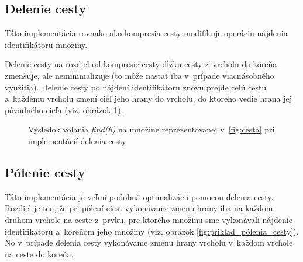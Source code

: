 \subsection{Delenie cesty}

Táto implementácia rovnako ako kompresia cesty modifikuje operáciu nájdenia identifikátoru množiny.

Delenie cesty na rozdieľ od kompresie cesty dĺžku cesty z~vrcholu do koreňa zmenšuje, ale neminimalizuje (to môže nastať iba v~prípade viacnásobného využitia). Delenie cesty po nájdení identifikátoru znovu prejde celú cestu a~každému vrcholu zmení cieľ jeho hrany do vrcholu, do ktorého vedie hrana jej pôvodného cieľa (viz. obrázok \ref{fig:priklad_delenie_cesty}).

\begin{figure}[H]
    \centering
    \captionsetup{justification=centering}
         
    \caption{Výsledok volania \emph{find(6)} na množine reprezentovanej v~\ref{fig:cesta} pri implementácií delenia cesty}
    \label{fig:priklad_delenie_cesty}
\end{figure}

\subsection{Pólenie cesty}

Táto implementácia je veľmi podobná optimalizácií pomocou delenia cesty. Rozdiel je ten, že pri pólení ciest vykonávame zmenu hrany iba na každom druhom vrchole na ceste z~prvku, pre ktorého množinu sme vykonávali nájdenie identifikátoru a~koreňom jeho množiny (viz. obrázok \ref{fig:priklad_pólenia_cesty}). No v~prípade delenia cesty vykonávame zmenu hrany vrcholu v~každom vrchole na ceste do koreňa.

